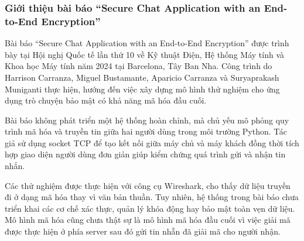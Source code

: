 \subsubsection{Giới thiệu bài báo “Secure Chat Application with an End-to-End Encryption”}
\indent Bài báo “Secure Chat Application with an End-to-End Encryption” được trình bày tại Hội nghị Quốc tế lần thứ 10 về Kỹ thuật Điện, Hệ thống Máy tính và Khoa học Máy tính năm 2024 tại Barcelona, Tây Ban Nha. Công trình do Harrison Carranza, Miguel Bustamante, Aparicio Carranza và Suryaprakash Muniganti thực hiện, hướng đến việc xây dựng mô hình thử nghiệm cho ứng dụng trò chuyện bảo mật có khả năng mã hóa đầu cuối.

\indent Bài báo không phát triển một hệ thống hoàn chỉnh, mà chủ yếu mô phỏng quy trình mã hóa và truyền tin giữa hai người dùng trong môi trường Python. Tác giả sử dụng socket TCP để tạo kết nối giữa máy chủ và máy khách đồng thời tích hợp giao diện người dùng đơn giản giúp kiểm chứng quá trình gửi và nhận tin nhắn.

\indent Các thử nghiệm được thực hiện với công cụ Wireshark, cho thấy dữ liệu truyền đi ở dạng mã hóa thay vì văn bản thuần. Tuy nhiên, hệ thống trong bài báo chưa triển khai các cơ chế xác thực, quản lý khóa động hay bảo mật toàn vẹn dữ liệu. Mô hình mã hóa cũng chưa thật sự là mô hình mã hóa đầu cuối vì việc giải mã được thực hiện ở phía server sau đó gửi tin nhẵn đã giải mã cho người nhận.
